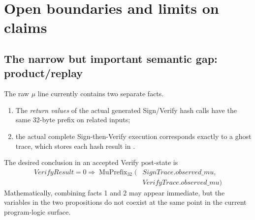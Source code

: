 \section{Open boundaries and limits on claims}
\label{sec:boundaries}

\subsection{The narrow but important semantic gap: product/replay}

The raw \(\mu\) line currently contains two separate facts.

\begin{enumerate}
  \item The \emph{return values} of the actual generated Sign/Verify hash calls
        have the same 32-byte prefix on related inputs;
  \item the actual complete Sign-then-Verify execution corresponds exactly to
        a ghost trace, which stores each hash result in .
\end{enumerate}

The desired conclusion in an accepted Verify post-state is
\[
\begin{aligned}
  \mathit{VerifyResult}=0\Longrightarrow
  \operatorname{MuPrefix}_{32}(&
    \mathit{SignTrace.observed\_mu},\\[-0.3em]
    &\mathit{VerifyTrace.observed\_mu})
\end{aligned}
\]
Mathematically, combining facts 1 and 2 may appear immediate, but the variables
in the two propositions do not coexist at the same point in the current
program-logic surface.

\begin{center}
\end{center}

